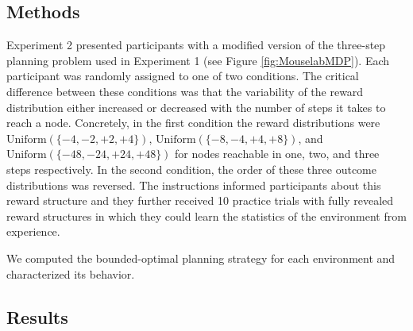\subsection{Methods}
Experiment 2 presented participants with a modified version of the three-step planning problem used in Experiment 1 (see Figure \ref{fig:MouselabMDP}). Each participant was randomly assigned to one of two conditions. The critical difference between these conditions was that the variability of the reward distribution either increased or decreased with the number of steps it takes to reach a node. Concretely, in the first condition the reward distributions were $\text{Uniform}(\lbrace -4,-2,+2,+4 \rbrace)$, $\text{Uniform}(\lbrace -8,-4,+4,+8 \rbrace)$, and $\text{Uniform}(\lbrace -48,-24,+24,+48 \rbrace)$ for nodes reachable in one, two, and three steps respectively. In the second condition, the order of these three outcome distributions was reversed. The instructions informed participants about this reward structure and they further received 10 practice trials with fully revealed reward structures in which they could learn the statistics of the environment from experience.


We computed the bounded-optimal planning strategy for each environment and characterized its behavior.%


\subsection{Results}

